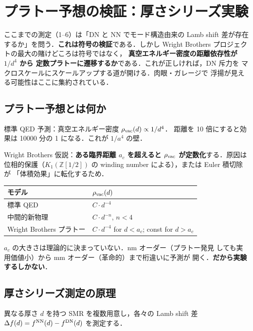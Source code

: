 \documentclass[11pt,a4paper]{article}
\begin{document}
\section{プラトー予想の検証：厚さシリーズ実験}

ここまでの測定（1--6）は「DN と NN でモード構造由来の Lamb shift
差が存在するか」を問う．\textbf{これは符号の検証}である．しかし
Wright Brothers プロジェクトの最大の賭けどころは符号ではなく，
\textbf{真空エネルギー密度の距離依存性が $1/d^4$ から
定数プラトーに遷移するか}である．これが正しければ，DN 斥力を
マクロスケールにスケールアップする道が開ける．肉眼・ガレージで
浮揚が見える可能性はここに集約されている．

\subsection{プラトー予想とは何か}

標準 QED 予測：真空エネルギー密度 $\rho_{\rm vac}(d) \propto 1/d^4$．
距離を 10 倍にすると効果は 10000 分の 1 になる．これが $1/a^4$ の壁．

Wright Brothers 仮説：\textbf{ある臨界距離 $a_c$ を超えると
$\rho_{\rm vac}$ が定数化}する．原因は位相的保護（$K_1(\mathbb Z[1/2])$
の winding number による），または Euler 積切除が
「体積効果」に転化するため．

\begin{center}
\begin{tabular}{ll}
\toprule
モデル & $\rho_{\rm vac}(d)$ \\
\midrule
標準 QED & $C \cdot d^{-4}$ \\
中間的新物理 & $C \cdot d^{-n}$, $n < 4$ \\
Wright Brothers プラトー & $C \cdot d^{-4}$ for $d < a_c$; const for $d > a_c$ \\
\bottomrule
\end{tabular}
\end{center}

$a_c$ の大きさは理論的に決まっていない．nm オーダー（プラトー発見
しても実用価値小）から mm オーダー（革命的）まで桁違いに予測が
開く．\textbf{だから実験するしかない}．

\subsection{厚さシリーズ測定の原理}

異なる厚さ $d$ を持つ SMR を複数用意し，各々の Lamb shift
差 $\Delta f(d) = f^{\rm NN}(d) - f^{\rm DN}(d)$ を測定する．
\end{document}
